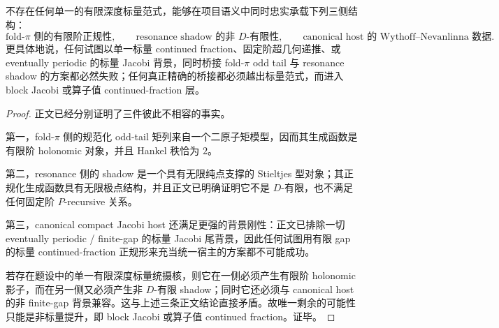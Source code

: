 \begin{theorem}\label{thm:conclusion-oddtail-no-scalar-unifying-pi-kernel}
不存在任何单一的有限深度标量范式，能够在项目语义中同时忠实承载下列三侧结构：
\[
\text{fold-\(\pi\) 侧的有限阶正规性},
\qquad
\text{resonance shadow 的非 \(D\)-有限性},
\qquad
\text{canonical host 的 Wythoff--Nevanlinna 数据}.
\]
更具体地说，任何试图以单一标量 continued fraction、固定阶超几何递推、或 eventually periodic 的标量 Jacobi 背景，同时桥接 fold-\(\pi\) odd tail 与 resonance shadow 的方案都必然失败；任何真正精确的桥接都必须越出标量范式，而进入 block Jacobi 或算子值 continued-fraction 层。
\end{theorem}
\begin{proof}
正文已经分别证明了三件彼此不相容的事实。

第一，fold-\(\pi\) 侧的规范化 odd-tail 矩列来自一个二原子矩模型，因而其生成函数是有限阶 holonomic 对象，并且 Hankel 秩恰为 \(2\)。

第二，resonance 侧的 shadow 是一个具有无限纯点支撑的 Stieltjes 型对象；其正规化生成函数具有无限极点结构，并且正文已明确证明它不是 \(D\)-有限，也不满足任何固定阶 \(P\)-recursive 关系。

第三，canonical compact Jacobi host 还满足更强的背景刚性：正文已排除一切 eventually periodic / finite-gap 的标量 Jacobi 尾背景，因此任何试图用有限 gap 的标量 continued-fraction 正规形来充当统一宿主的方案都不可能成功。

若存在题设中的单一有限深度标量统摄核，则它在一侧必须产生有限阶 holonomic 影子，而在另一侧又必须产生非 \(D\)-有限 shadow；同时它还必须与 canonical host 的非 finite-gap 背景兼容。这与上述三条正文结论直接矛盾。故唯一剩余的可能性只能是非标量提升，即 block Jacobi 或算子值 continued fraction。证毕。
\end{proof}

